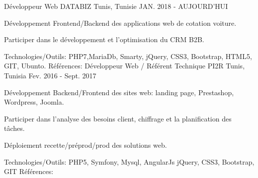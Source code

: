 \begin{cventries}
  \techentries
    {Développeur Web}
    {DATABIZ}
    {Tunis, Tunisie}
    {JAN. 2018 - AUJOURD'HUI}
    {
      \begin{cvitems}
		    \item {Développement Frontend/Backend des applications web de cotation voiture.}		
		    \item {Participer dans le développement et l'optimisation du CRM B2B.}
      \end{cvitems}
    }
    {\textcolor{awesome}{Technologies/Outils: } {\color{graytext}}  {PHP7,MariaDb, Smarty, jQuery, CSS3, Bootstrap, HTML5, GIT, Ubunto.}}
    {Références:} 
    {\href{https://www.reprise-citroen.fr//}{} \break
     \href{https://www.reprise-cash-bypeugeot.fr/}{} \break
     \href{https://www.reprise.dsautomobiles.fr/}{}\break
     \href{https://ankaufservice.renault.de/}{}\break
    }
  \techentries
    {Développeur Web / Référent Technique}
    {PI2R}
    {Tunis, Tunisia}
    {Fev. 2016 - Sept. 2017}
    {
      \begin{cvitems}
        \item {Développement Backend/Frontend des sites web: landing page, Prestashop, Wordpress, Joomla.}
        \item {Participer dans l'analyse des besoins client, chiffrage et la planification des tâches.}
        \item {Déploiement recette/préprod/prod des solutions web.}
      \end{cvitems}
    }
    {\textcolor{awesome}{Technologies/Outils: } {\color{graytext}}  {PHP5, Symfony, Mysql, AngularJs jQuery, CSS3, Bootstrap, GIT}}
    {Références:} 
    {\href{http://www.tuttosport.tn/}{} \break
    \href{http://www.milddream.com/fr/ }{} \break
    \href{https://www.tvsoftconsult.com/ }{} \break
}
\end{cventries}
